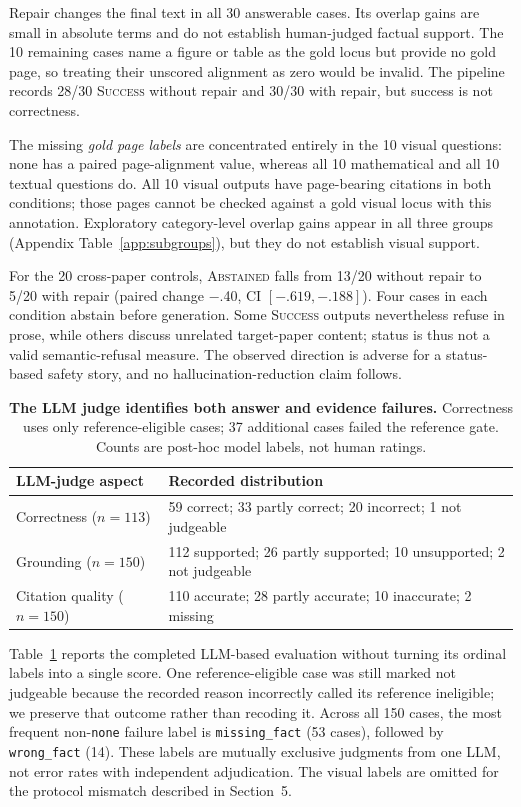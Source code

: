 Repair changes the final text in all 30 answerable cases. Its overlap gains are small in absolute terms and do not establish human-judged factual support. The 10 remaining cases name a figure or table as the gold locus but provide no gold page, so treating their unscored alignment as zero would be invalid. The pipeline records 28/30 \textsc{Success} without repair and 30/30 with repair, but success is not correctness.

The missing \emph{gold page labels} are concentrated entirely in the 10 visual questions: none has a paired page-alignment value, whereas all 10 mathematical and all 10 textual questions do. All 10 visual outputs have page-bearing citations in both conditions; those pages cannot be checked against a gold visual locus with this annotation. Exploratory category-level overlap gains appear in all three groups (Appendix Table~\ref{app:subgroups}), but they do not establish visual support.

For the 20 cross-paper controls, \textsc{Abstained} falls from 13/20 without repair to 5/20 with repair (paired change $-$.40, CI $[-.619,-.188]$). Four cases in each condition abstain before generation. Some \textsc{Success} outputs nevertheless refuse in prose, while others discuss unrelated target-paper content; status is thus not a valid semantic-refusal measure. The observed direction is adverse for a status-based safety story, and no hallucination-reduction claim follows.

\begin{table}[t]
\centering
\scriptsize
\begin{tabular}{@{}p{}p{}@{}}
\toprule
LLM-judge aspect & Recorded distribution \\
\midrule
Correctness ($n=113$) & 59 correct; 33 partly correct; 20 incorrect; 1 not judgeable \\
Grounding ($n=150$) & 112 supported; 26 partly supported; 10 unsupported; 2 not judgeable \\
Citation quality ($n=150$) & 110 accurate; 28 partly accurate; 10 inaccurate; 2 missing \\
\bottomrule
\end{tabular}
\caption{\textbf{The LLM judge identifies both answer and evidence failures.} Correctness uses only reference-eligible cases; 37 additional cases failed the reference gate. Counts are post-hoc model labels, not human ratings.}
\label{tab:llm}
\end{table}

Table~\ref{tab:llm} reports the completed LLM-based evaluation without turning its ordinal labels into a single score. One reference-eligible case was still marked not judgeable because the recorded reason incorrectly called its reference ineligible; we preserve that outcome rather than recoding it. Across all 150 cases, the most frequent non-\texttt{none} failure label is \texttt{missing\_fact} (53 cases), followed by \texttt{wrong\_fact} (14). These labels are mutually exclusive judgments from one LLM, not error rates with independent adjudication. The visual labels are omitted for the protocol mismatch described in Section~5.

